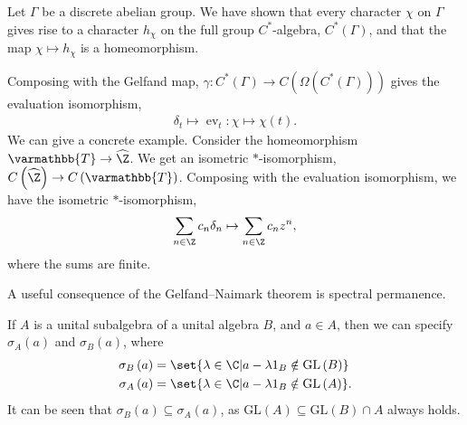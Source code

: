 \documentclass[10pt]{mypackage}
\renewcommand*{\mathbb}[1]{\varmathbb{#1}}
\newcommand{\T}{\mathbb{T}}
\newcommand{\GL}{\text{GL}}
\begin{document}
\begin{example}
  Let $\Gamma$ be a discrete abelian group. We have shown that every character $\chi$ on $\Gamma$ gives rise to a character $h_{\chi}$ on the full group $C^{\ast}$-algebra, $C^{\ast}\left(\Gamma\right)$, and that the map $\chi \mapsto h_{\chi}$ is a homeomorphism.\newline

  Composing with the Gelfand map, $\gamma\colon C^{\ast}\left(\Gamma\right)\rightarrow C\left(\Omega\left(C^{\ast}\left(\Gamma\right)\right)\right)$ gives the evaluation isomorphism,
  \begin{align*}
    \delta_t\mapsto \operatorname{ev}_t\colon \chi\mapsto \chi\left(t\right).
  \end{align*}
  We can give a concrete example. Consider the homeomorphism $\T\rightarrow \widehat{\Z}$. We get an isometric $\ast$-isomorphism, $C\left(\widehat{\Z}\right)\rightarrow C\left(\T\right)$. Composing with the evaluation isomorphism, we have the isometric $\ast$-isomorphism,
  \begin{align*}
    \sum_{n\in\Z}c_n\delta_n\mapsto \sum_{n\in\Z}c_nz^n,
  \end{align*}
  where the sums are finite.
\end{example}
A useful consequence of the Gelfand--Naimark theorem is spectral permanence.\newline

If $A$ is a unital subalgebra of a unital algebra $B$, and $a\in A$, then we can specify $\sigma_A\left(a\right)$ and $\sigma_B\left(a\right)$, where
\begin{align*}
  \sigma_B\left(a\right) &= \set{\lambda\in\C | a - \lambda 1_B \notin \GL\left(B\right)}\\
  \sigma_A\left(a\right) &= \set{\lambda\in\C | a- \lambda 1_B \notin \GL\left(A\right)}.
\end{align*}
It can be seen that $\sigma_B\left(a\right)\subseteq \sigma_A\left(a\right)$, as $\GL\left(A\right) \subseteq \GL\left(B\right)\cap A$ always holds.\newline
\end{document}
